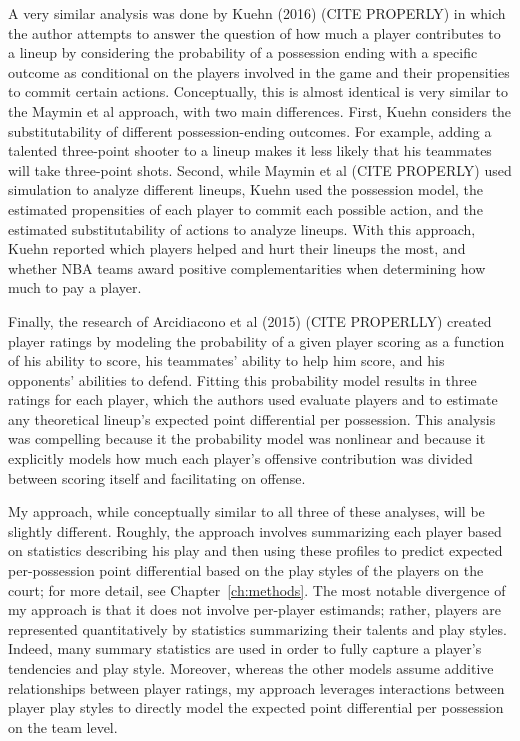 A very similar analysis was done by Kuehn (2016) (CITE PROPERLY) in which the author
attempts to answer the question of how much a player contributes to a lineup by
considering the probability of a possession ending with a specific outcome as
conditional on the players involved in the game and their propensities to commit
certain actions.  Conceptually, this is almost identical is very similar to the
Maymin et al approach, with two main differences. First, Kuehn considers the
substitutability of different possession-ending outcomes. For example, adding a
talented three-point shooter to a lineup makes it less likely that his teammates
will take three-point shots. Second, while Maymin et al (CITE PROPERLY) used
simulation to analyze different lineups, Kuehn used the possession model, the
estimated propensities of each player to commit each possible action, and the
estimated substitutability of actions to analyze lineups. With this approach, Kuehn
reported which players helped and hurt their lineups the most, and whether NBA teams
award positive complementarities when determining how much to pay a player.

Finally, the research of Arcidiacono et al (2015) (CITE PROPERLLY) created player
ratings by modeling the probability of a given player scoring as a function of his
ability to score, his teammates' ability to help him score, and his opponents'
abilities to defend.  Fitting this probability model results in three ratings for
each player, which the authors used evaluate players and to estimate any theoretical
lineup's expected point differential per possession. This analysis was compelling
because it the probability model was nonlinear and because it explicitly models how
much each player's offensive contribution was divided between scoring itself and
facilitating on offense.

My approach, while conceptually similar to all three of these analyses, will be
slightly different. Roughly, the approach involves summarizing each player based on
statistics describing his play and then using these profiles to predict expected
per-possession point differential based on the play styles of the players on the
court; for more detail, see Chapter~\ref{ch:methods}. The most notable divergence of
my approach is that it does not involve per-player estimands; rather, players are
represented quantitatively by statistics summarizing their talents and play styles.
Indeed, many summary statistics are used in order to fully capture a player's
tendencies and play style. Moreover, whereas the other models assume additive
relationships between player ratings, my approach leverages interactions
between player play styles to directly model the expected point differential per
possession on the team level.

